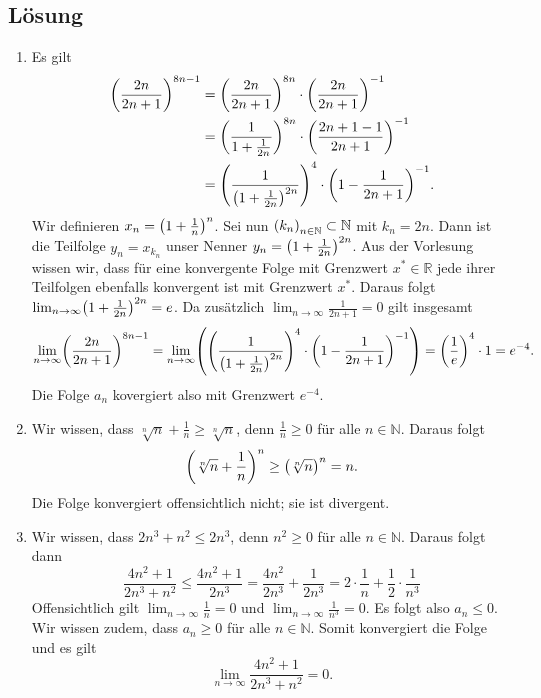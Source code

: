 \documentclass[german,12pt]{homework}
\newcommand{\NN}{\mathbb{N}}
\newcommand{\RR}{\mathbb{R}}
\DeclarePairedDelimiter{\enbrace}{(}{)}
\begin{document}
    \subsection*{Lösung}
    \begin{enumerate}
        \item Es gilt
        \begin{align*}
          \enbrace*{\frac{2n}{2n + 1}}^{8n - 1} &= \enbrace*{\frac{2n}{2n + 1}}^{8n} \cdot \enbrace*{\frac{2n}{2n + 1}}^{-1}\\
          &= \enbrace*{\frac{1}{1 + \frac{1}{2n}}}^{8n} \cdot \enbrace*{\frac{2n + 1 - 1}{2n + 1}}^{-1}\\
          &= \enbrace*{\frac{1}{\enbrace*{1 + \frac{1}{2n}}^{2n}}}^4 \cdot \enbrace*{1 - \frac{1}{2n + 1}}^{-1}.
        \end{align*}
        Wir definieren \(x_n = \enbrace*{1 + \frac{1}{n}}^n\). Sei nun
        \(\enbrace*{k_n}_{n \in \NN} \subset \NN\) mit \(k_n = 2n\). Dann ist
        die Teilfolge \(y_n = x_{k_n}\) unser Nenner
        \(y_n = \enbrace*{1 + \frac{1}{2n}}^{2n}\). Aus der Vorlesung wissen
        wir, dass für eine konvergente Folge mit Grenzwert \(x^* \in \RR\) jede
        ihrer Teilfolgen ebenfalls konvergent ist mit Grenzwert \(x^*\). Daraus
        folgt \(\lim_{n \to \infty}\enbrace*{1 + \frac{1}{2n}}^{2n} = e\). Da
        zusätzlich \(\lim_{n \to \infty}\frac{1}{2n + 1} = 0\) gilt insgesamt
        \[\lim_{n \to \infty}\enbrace*{\frac{2n}{2n + 1}}^{8n - 1} = \lim_{n \to \infty}\enbrace*{\enbrace*{\frac{1}{\enbrace*{1 + \frac{1}{2n}}^{2n}}}^4 \cdot \enbrace*{1 - \frac{1}{2n + 1}}^{-1}} = \enbrace*{\frac{1}{e}}^4 \cdot 1 = e^{-4}.\]
        Die Folge \(a_n\) kovergiert also mit Grenzwert \(e^{-4}\).
        \item Wir wissen, dass \(\sqrt[n]{n} + \frac{1}{n} \ge \sqrt[n]{n}\), denn \(\frac{1}{n} \ge 0\) für alle \(n \in \NN\). Daraus folgt
        \[\enbrace*{\sqrt[n]{n} + \frac{1}{n}}^n \ge \enbrace*{\sqrt[n]{n}}^n = n.\]
        Die Folge konvergiert offensichtlich nicht; sie ist divergent.
        \item Wir wissen, dass \(2n^3 + n^2 \le 2n^3\), denn \(n^2 \ge 0\) für alle \(n \in \NN\). Daraus folgt dann
        \[\frac{4n^2 + 1}{2n^3 + n^2} \le \frac{4n^2 + 1}{2n^3} = \frac{4n^2}{2n^3} + \frac{1}{2n^3} = 2 \cdot \frac{1}{n} + \frac{1}{2} \cdot \frac{1}{n^3}\]
        Offensichtlich gilt \(\lim_{n \to \infty}\frac{1}{n} = 0\) und \(\lim_{n \to \infty}\frac{1}{n^3} = 0\). Es folgt also \(a_n \le 0\). Wir wissen zudem, dass \(a_n \ge 0\) für alle \(n \in \NN\). Somit konvergiert die Folge und es gilt
        \[\lim_{n \to \infty}\frac{4n^2 + 1}{2n^3 + n^2} = 0.\]
    \end{enumerate}
\end{document}

